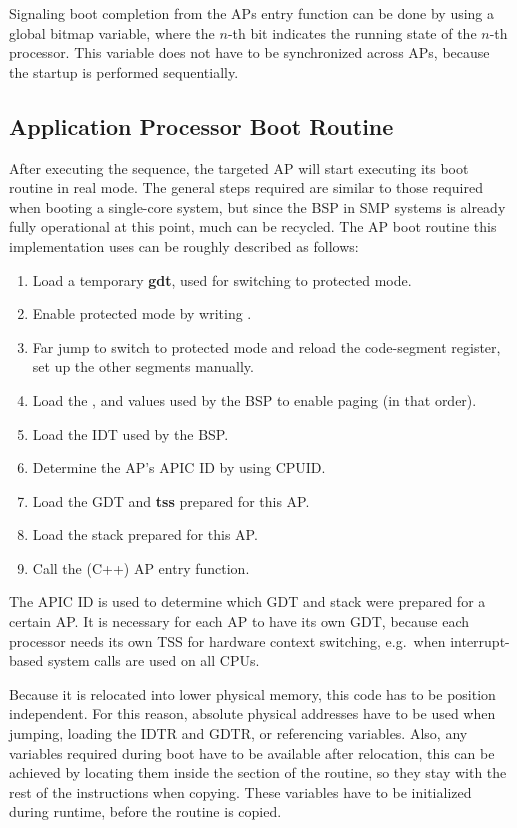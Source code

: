 Signaling boot completion from the APs entry function can be done by using a global bitmap variable, where the \(n\)-th bit indicates the running state of the \(n\)-th processor.
This variable does not have to be synchronized across APs, because the startup is performed sequentially.

\subsection{Application Processor Boot Routine}
\label{subsec:apboot}

After executing the  sequence, the targeted AP will start executing its boot routine in real mode.
The general steps required are similar to those required when booting a single-core system, but since the BSP in SMP systems is already fully operational at this point, much can be recycled.
The AP boot routine this implementation uses can be roughly described as follows:

\begin{enumerate}
  \item Load a temporary \textbf{\gls{gdt}}, used for switching to protected mode.
  \item Enable protected mode by writing .
  \item Far jump to switch to protected mode and reload the code-segment register, set up the other segments manually.
  \item Load the ,  and  values used by the BSP to enable paging (in that order).
  \item Load the IDT used by the BSP\@.
  \item Determine the AP's APIC ID by using CPUID\@.
  \item Load the GDT and \textbf{\gls{tss}} prepared for this AP\@.
  \item Load the stack prepared for this AP\@.
  \item Call the (C++) AP entry function.
\end{enumerate}

The APIC ID is used to determine which GDT and stack were prepared for a certain AP\@.
It is necessary for each AP to have its own GDT, because each processor needs its own TSS for hardware context switching, e.g.\ when interrupt-based system calls are used on all CPUs.

Because it is relocated into lower physical memory, this code has to be position independent.
For this reason, absolute physical addresses have to be used when jumping, loading the IDTR and GDTR, or referencing variables.
Also, any variables required during boot have to be available after relocation, this can be achieved by locating them inside the  section of the routine, so they stay with the rest of the instructions when copying.
These variables have to be initialized during runtime, before the routine is copied.

